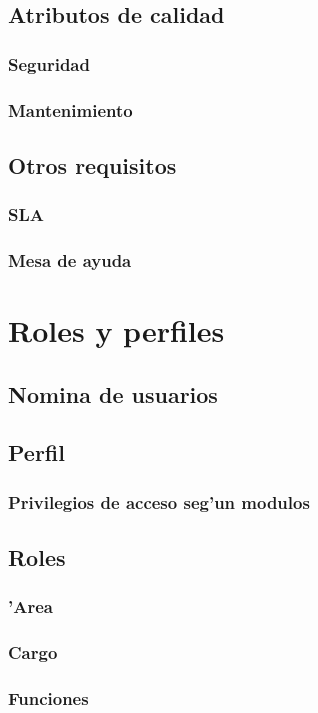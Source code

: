 \documentclass[letterpaper,openright,10pt,oneside]{report}
\begin{document}
		\section{Atributos de calidad}
			\subsection{Seguridad}
			\subsection{Mantenimiento}
		\section{Otros requisitos}
			\subsection{SLA}
			\subsection{Mesa de ayuda}
	\chapter{Roles y perfiles}
		\section{Nomina de usuarios}
		\section{Perfil}
			\subsection{Privilegios de acceso seg'un modulos}
		\section{Roles}
			\subsection{'Area}
			\subsection{Cargo}
			\subsection{Funciones}
\end{document}
